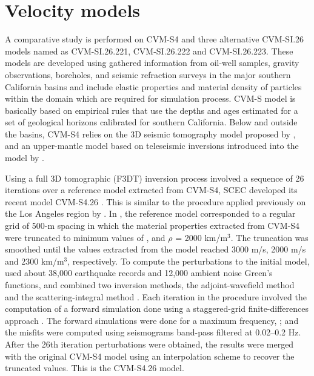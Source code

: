 
\section{Velocity models}

A comparative study is performed on CVM-S4 and three alternative CVM-SI.26 models named as CVM-SI.26.221, CVM-SI.26.222 and CVM-SI.26.223. These models are developed using gathered information from oil-well samples, gravity observations, boreholes, and seismic refraction surveys in the major southern California basins and include elastic properties and material density of particles within the domain which are required for simulation process.
CVM-S model is basically based on empirical rules that use the depths and ages estimated for a set of geological horizons calibrated for southern California. Below and outside the basins, CVM-S4 relies on the 3D seismic tomography model proposed by \citet{Hauksson_2000_JGR}, and an upper-mantle model based on teleseismic inversions introduced into the model by \citet{Kohler_2003_BSSA}.

Using a full 3D tomographic (F3DT) inversion process involved a sequence of 26 iterations over a reference model extracted from CVM-S4, SCEC developed its recent model CVM-S4.26 \citep{Lee_2014_JGR}. This is similar to the procedure applied previously on the Los Angeles region by \citet{Chen_2007_BSSA}.
In \citet{Lee_2014_JGR}, the reference model corresponded to a regular grid of 500-m spacing in which the material properties extracted from CVM-S4 were truncated to minimum values of ,  and $\rho$ = 2000 km/m$^3$. The truncation was smoothed until the values extracted from the model reached 3000 m/s, 2000 m/s and 2300 km/m$^3$, respectively. To compute the perturbations to the initial model, \citet{Lee_2014_JGR} used about 38,000 earthquake records and 12,000 ambient noise Green's functions, and combined two inversion methods, the adjoint-wavefield method \citep[AW-F3DT;][]{Tromp_2005_GJI} and the scattering-integral method \citep[SI-F3DT;][]{Zhao_2005_BSSA}. Each iteration in the procedure involved the computation of a forward simulation done using a staggered-grid finite-differences approach \citep{Olsen_1994_Thesis}. The forward simulations were done for a maximum frequency, ; and the misfits were computed using seismograms band-pass filtered at 0.02--0.2 Hz. After the 26th iteration perturbations were obtained, the results were merged with the original CVM-S4 model using an interpolation scheme to recover the truncated values. This is the CVM-S4.26 model.

